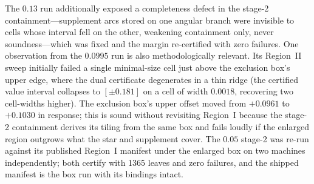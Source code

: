 The $0.13$ run additionally exposed a completeness
defect in the stage-2 containment---supplement arcs stored on one
angular branch were invisible to cells whose interval fell on the
other, weakening containment only, never soundness---which was fixed
and the margin re-certified with zero failures.  One observation from
the $0.0995$ run is also methodologically relevant.  Its Region~II sweep initially
failed a single minimal-size cell just above the exclusion box's
upper edge, where the dual certificate degenerates in a thin ridge
(the certified value interval collapses to $[\pm 0.181]$ on a cell of
width $0.0018$, recovering two cell-widths higher).  The exclusion
box's upper offset moved from $+0.0961$ to $+0.1030$ in response;
this is sound without revisiting Region~I because the stage-2
containment derives its tiling from the same box and fails loudly if
the enlarged region outgrows what the star and supplement cover.  The
$0.05$ stage-2 was re-run against its published Region~I manifest
under the enlarged box on two machines independently; both certify
with 1365 leaves and zero failures, and the shipped manifest is the
box run with its bindings intact.


